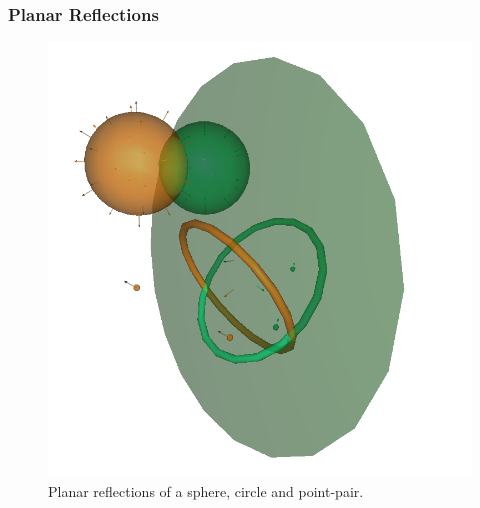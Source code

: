 \documentclass{beamer}
\begin{document}
\begin{frame}
\frametitle{Planar Reflections}
\begin{figure}
\centering
\includegraphics[scale=0.3]{PlanarReflectionsPerspectiveOne}
\caption{Planar reflections of a sphere, circle and point-pair.}
\end{figure}
\end{frame}
\end{document}
